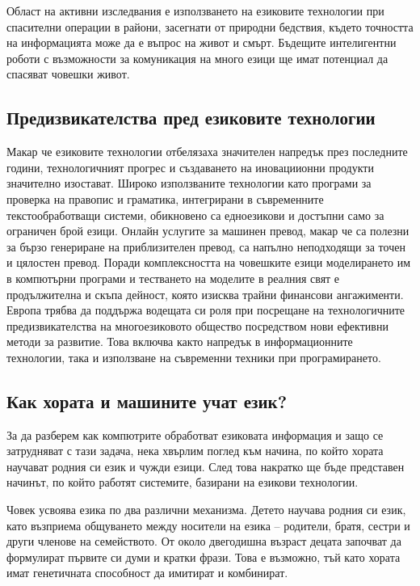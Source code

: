 \documentclass[]{../../metanetpaper}
\begin{document}
\begin{multicols}{2}
Област на активни изследвания е използването на езиковите технологии при спасителни операции в райони, засегнати от природни бедствия, където
 точността на информацията може да е въпрос на живот и смърт. Бъдещите интелигентни роботи с възможности за комуникация на много езици ще имат потенциал да спасяват човешки живот.

\subsection{Предизвикателства пред езиковите технологии}

Макар че езиковите технологии отбелязаха значителен
 напредък през последните години,
 технологичният прогрес и създаването на иновациионни продукти значително изостават. Широко използваните технологии като програми за проверка на правопис и граматика, интегрирани в съвременните текстообработващи системи, 
обикновено са едноезикови и достъпни само за ограничен брой езици. 
Онлайн услугите за машинен превод, макар че са полезни за бързо генериране на приблизителен превод, са напълно неподходящи за точен и цялостен превод. Поради комплексността на човешките езици моделирането им в компютърни програми и тестването на моделите в реалния свят е продължителна и скъпа дейност, която изисква трайни финансови ангажименти.  
Европа трябва да поддържа водещата си роля при посрещане на технологичните предизвикателства на многоезиковото общество посредством нови ефективни методи за развитие. Това включва както напредък в информационните технологии, така и използване на съвременни техники при програмирането.

\subsection{Как хората и машините учат език?}

За да разберем как компютрите обработват езиковата информация и защо се затрудняват с тази задача, нека хвърлим поглед към начина, по който хората научават родния си език и чужди езици. След това
 накратко ще бъде представен начинът, по който работят системите, базирани на езикови технологии.

Човек усвоява езика по два различни механизма. Детето
 научава родния си език, като възприема общуването между
 носители на езика – родители, братя, сестри и други
 членове на семейството. От около двегодишна възраст децата започват да формулират първите си думи и кратки фрази. Това е възможно, тъй като хората имат генетичната способност да имитират и комбинират.


\end{multicols}
\end{document}
